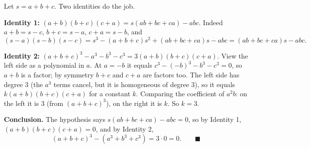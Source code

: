Let $s=a+b+c$. Two identities do the job.

\textbf{Identity 1:} $(a+b)(b+c)(c+a)=s(ab+bc+ca)-abc$. Indeed $a+b=s-c$, $b+c=s-a$, $c+a=s-b$, and
\[
(s-a)(s-b)(s-c)=s^3-(a+b+c)s^2+(ab+bc+ca)s-abc=(ab+bc+ca)s-abc .
\]

\textbf{Identity 2:} $(a+b+c)^3-a^3-b^3-c^3=3(a+b)(b+c)(c+a)$. View the left side as a polynomial in $a$. At $a=-b$ it equals $c^3-(-b)^3-b^3-c^3=0$, so $a+b$ is a factor; by symmetry $b+c$ and $c+a$ are factors too. The left side has degree $3$ (the $a^3$ terms cancel, but it is homogeneous of degree $3$), so it equals $k(a+b)(b+c)(c+a)$ for a constant $k$. Comparing the coefficient of $a^2b$: on the left it is $3$ (from $(a+b+c)^3$), on the right it is $k$. So $k=3$.

\textbf{Conclusion.} The hypothesis says $s(ab+bc+ca)-abc=0$, so by Identity 1, $(a+b)(b+c)(c+a)=0$, and by Identity 2,
\[
(a+b+c)^3-\left(a^3+b^3+c^3\right)=3\cdot0=0 .\qquad\blacksquare
\]

